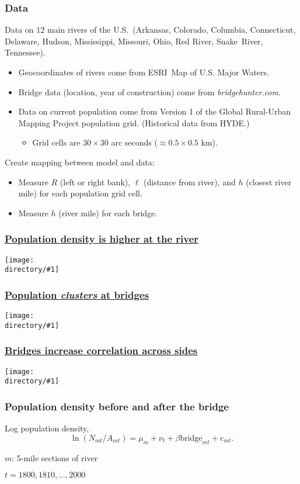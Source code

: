 \documentclass[compress,mathserif]{beamer}
\newcounter{ora}
\newcommand{\directory}{exhibits}
\newcommand{\widefigure}[2]{\begin{frame}\frametitle{\hyperlink{#1back}{#2}}\hypertarget{#1}{{\begin{center}\texttt{[image: \\directory/\#1]}\end{center}}}\end{frame}}
\begin{document}
\begin{frame}%

\frametitle{Data}

Data on $12$ main rivers of the U.S.\ (Arkansas, Colorado, Columbia,
Connecticut, Delaware, Hudson, Mississippi, Missouri, Ohio, Red River,
Snake\ River, Tennessee).

\begin{itemize}
\item Geocoordinates of rivers come from ESRI\ Map of U.S. Major Waters.

\item Bridge data (location, year of construction) come from \textit{%
bridgehunter.com}.

\item Data on current population come from Version 1 of the Global
Rural-Urban Mapping Project population grid. (Historical data from HYDE.)

\begin{itemize}
\item Grid cells are $30\times 30$ arc seconds ($\approx 0.5\times 0.5$ km).
\end{itemize}
\end{itemize}

Create mapping between model and data:

\begin{itemize}
\item Measure $R$ (left or right bank), $\ell $ (distance from river), and $h
$\newline
(closest river mile) for each population grid cell.

\item Measure $h$ (river mile) for each bridge.
\end{itemize}

\end{frame}%


\widefigure{density-at-rivers}{Population density is higher at the river}
\widefigure{clustering-at-bridges}{Population \emph{clusters} at bridges}
\widefigure{correlation-of-two-sides}{Bridges increase correlation across sides}

\begin{frame}\frametitle{Population density before and after the bridge}
Log population density,
\[
\ln (N_{mt}/A_{mt}) = \mu_m+\nu_t+ \beta \text{bridge}_{mt}+e_{mt}.
\]

$m$: 5-mile sections of river

$t=1800, 1810, ..., 2000$
\end{frame}
\end{document}
